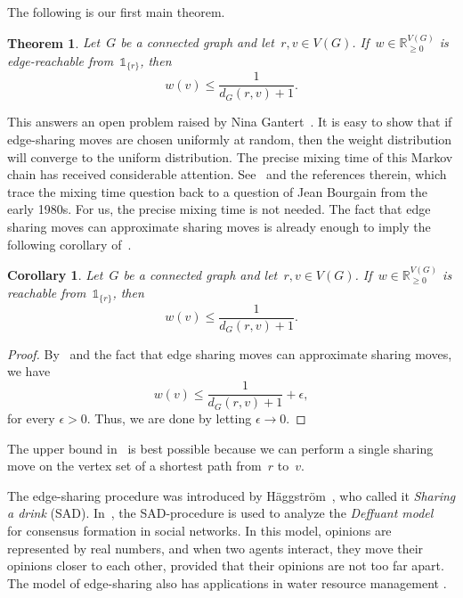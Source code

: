 \documentclass[reqno, 12pt]{amsart}
\numberwithin{equation}{section}
\numberwithin{figure}{section}
\theoremstyle{plain}
\newtheorem{theorem}[thm]{Theorem}
\newtheorem{cor}[thm]{Corollary}
\theoremstyle{definition}
\newcommand*{\weights}{\ensuremath{\mathbb{R}_{\geq 0}^{V(G)}}}
\begin{document}
The following is our first main theorem.

\begin{theorem}
    \label{thm:main}
    Let~$G$ be a connected graph and let~${r,v\in V(G)}$. 
    If~${w \in \weights}$ is edge-reachable from~$\mathds{1}_{\{r\}}$, then
    \[
        w(v) \leq \frac{1}{d_G(r,v)+1}.
    \]
\end{theorem}

This answers an open problem raised by Nina Gantert~\cite{gantert2024}. 
It is easy to show that if edge-sharing moves are chosen uniformly at random, then the weight distribution will converge to the uniform distribution. 
The precise mixing time of this Markov chain has received considerable attention. 
See~\cite{MSW22} and the references therein, which trace the mixing time question back to a question of Jean Bourgain from the early 1980s. For us, the precise mixing time is not needed.  The  fact that edge sharing moves can approximate sharing moves is already enough to imply the following corollary of~. 
\

\begin{cor}
    \label{cor:main}
    Let~$G$ be a connected graph and let~${r,v\in V(G)}$. 
    If~${w \in \weights}$ is reachable from~$\mathds{1}_{\{r\}}$, then
    \[
        w(v) \leq \frac{1}{d_G(r,v)+1}.
    \]
\end{cor}

\begin{proof}
By~ and the fact that edge sharing moves can approximate sharing moves, we have
\[
        w(v) \leq \frac{1}{d_G(r,v)+1}+\epsilon,
    \]
for every $\epsilon>0$. Thus, we are done by letting $\epsilon \to 0$.   
\end{proof}

The upper bound in~ is best possible because we can perform a single sharing move on the vertex set of a shortest path from~$r$ to~$v$. 


The edge-sharing procedure was introduced by H\"{a}ggstr\"{o}m~\cite{Haggstrom2012}, who called it \emph{Sharing a drink} (SAD). 
In~\cite{Haggstrom2012}, the SAD-procedure is used to analyze the \emph{Deffuant model}~\cite{DNAW2000} for consensus formation in social networks. 
In this model, opinions are represented by real numbers, and when two agents interact, they move their opinions closer to each other, provided that their opinions are not too far apart. 
The model of edge-sharing also has applications in water resource management \cite{HH2015, HH2019}. 
\end{document}
